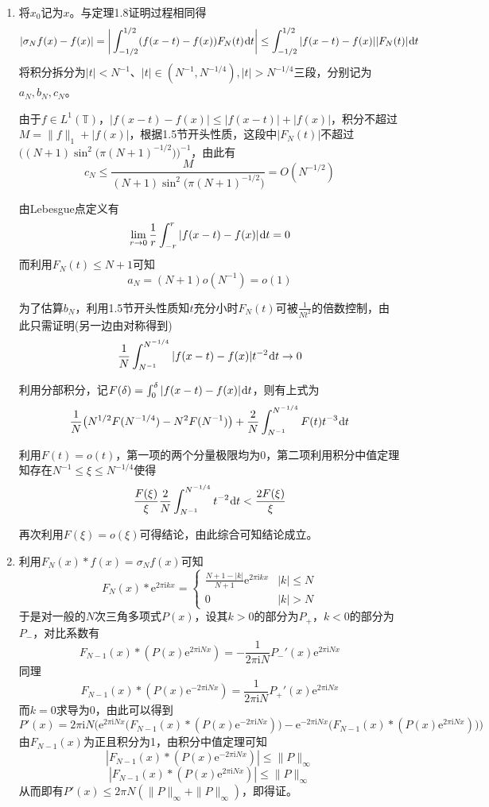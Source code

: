 \documentclass[a4paper,UTF8,fontset=windows]{ctexart}
\newcommand*{\er}{\mathrm{e}}
\newcommand*{\ir}{\mathrm{i}}
\newcommand*{\dr}{\hspace{0.07em}\mathrm{d}}
\begin{document}
\begin{enumerate}
    \item 将$x_0$记为$x$。与定理1.8证明过程相同得
    $$|\sigma_Nf(x)-f(x)|=\bigg|\int_{-1/2}^{1/2}(f(x-t)-f(x))F_N(t)\dr t\bigg|\le\int_{-1/2}^{1/2}|f(x-t)-f(x)||F_N(t)|\dr t$$
    将积分拆分为$|t|<N^{-1}$、$|t|\in(N^{-1},N^{-1/4}),|t|>N^{-1/4}$三段，分别记为$a_N,b_N,c_N$。

    由于$f\in L^1(\mathbb{T})$，$|f(x-t)-f(x)|\le|f(x-t)|+|f(x)|$，积分不超过$M=\|f\|_1+|f(x)|$，根据1.5节开头性质，这段中$|F_N(t)|$不超过$\big((N+1)\sin^2\big(\pi(N+1)^{-1/2}\big)\big)^{-1}$，由此有
    $$c_N\le\frac{M}{(N+1)\sin^2\big(\pi(N+1)^{-1/2}\big)}=O(N^{-1/2})$$

    由Lebesgue点定义有
    $$\lim_{r\to 0}\frac{1}{r}\int_{-r}^r|f(x-t)-f(x)|\dr t=0$$
    而利用$F_N(t)\le N+1$可知
    $$a_N=(N+1)o(N^{-1})=o(1)$$

    为了估算$b_N$，利用1.5节开头性质知$t$充分小时$F_N(t)$可被$\frac{1}{Nt^2}$的倍数控制，由此只需证明(另一边由对称得到)
    $$\frac{1}{N}\int_{N^{-1}}^{N^{-1/4}}|f(x-t)-f(x)|t^{-2}\dr t\to0$$

    利用分部积分，记$F(\delta)=\int_0^\delta|f(x-t)-f(x)|\dr t$，则有上式为
    $$\frac{1}{N}\big(N^{1/2}F(N^{-1/4})-N^2F(N^{-1})\big)+\frac{2}{N}\int_{N^{-1}}^{N^{-1/4}}F(t)t^{-3}\dr t$$

    利用$F(t)=o(t)$，第一项的两个分量极限均为0，第二项利用积分中值定理知存在$N^{-1}\le\xi\le N^{-1/4}$使得
    $$\frac{F(\xi)}{\xi}\frac{2}{N}\int_{N^{-1}}^{N^{-1/4}}t^{-2}\dr t<\frac{2F(\xi)}{\xi}$$

    再次利用$F(\xi)=o(\xi)$可得结论，由此综合可知结论成立。

    \item 利用$F_N(x)*f(x)=\sigma_Nf(x)$可知
    $$F_N(x)*\er^{2\pi\ir kx}=\begin{cases}\frac{N+1-|k|}{N+1}\er^{2\pi\ir kx}&|k|\le N\\0&|k|>N\end{cases}$$
    于是对一般的$N$次三角多项式$P(x)$，设其$k>0$的部分为$P_+$，$k<0$的部分为$P_-$，对比系数有
    $$F_{N-1}(x)*(P(x)\er^{2\pi\ir Nx})=-\frac{1}{2\pi\ir N}P_-'(x)\er^{2\pi\ir Nx}$$
    同理
    $$F_{N-1}(x)*(P(x)\er^{-2\pi\ir Nx})=\frac{1}{2\pi\ir N}P_+'(x)\er^{2\pi\ir Nx}$$
    而$k=0$求导为0，由此可以得到
    $$P'(x)=2\pi\ir N\big(\er^{2\pi\ir Nx}\big(F_{N-1}(x)*(P(x)\er^{-2\pi\ir Nx})\big)-\er^{-2\pi\ir Nx}\big(F_{N-1}(x)*(P(x)\er^{2\pi\ir Nx})\big)\big)$$
    由$F_{N-1}(x)$为正且积分为1，由积分中值定理可知
    $$|F_{N-1}(x)*(P(x)\er^{-2\pi\ir Nx})|\le\|P\|_\infty$$
    $$|F_{N-1}(x)*(P(x)\er^{2\pi\ir Nx})|\le\|P\|_\infty$$
    从而即有$P'(x)\le2\pi N(\|P\|_\infty+\|P\|_\infty)$，即得证。


\end{enumerate}
\end{document}
